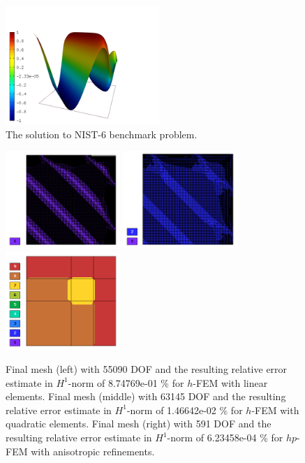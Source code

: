 \documentclass[12pt]{elsarticle}
\begin{document}
\begin{figure}[H]
\centering
\vspace{-3mm}
\includegraphics[height=4.5cm]{nist/nist-6/solution.png}
\caption{The solution to NIST-6 benchmark problem.}
\vspace{-3mm}
\label{fig:sln-nist06}
\end{figure}

\begin{figure}[H]
\centering
\vspace{-3mm}
\includegraphics[height=3.7cm]{nist/nist-6/mesh_h1_aniso.png}
\includegraphics[height=3.7cm]{nist/nist-6/mesh_h2_aniso.png}
\includegraphics[height=3.7cm]{nist/nist-6/mesh_hp_aniso.png}
\vspace{-3mm}
\caption{
Final mesh (left) with 55090 DOF and the resulting
relative error estimate in $H^1$-norm of 8.74769e-01 \% for $h$-FEM with linear elements.
Final mesh (middle) with 63145 DOF and the resulting
relative error estimate in $H^1$-norm of 1.46642e-02 \% for $h$-FEM with quadratic elements.
Final mesh (right) with 591 DOF and the resulting
relative error estimate in $H^1$-norm of 6.23458e-04 \% for $hp$-FEM with anisotropic refinements.}
\label{fig:nist-6-hp-aniso}
\end{figure}
\end{document}
